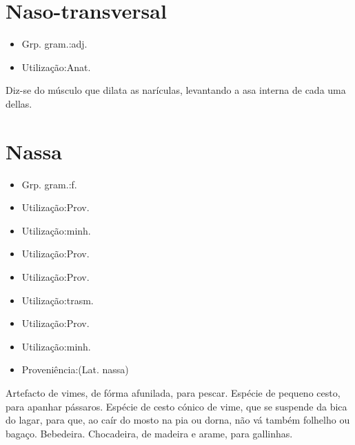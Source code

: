 \section{Naso-transversal}
\begin{itemize}
\item {Grp. gram.:adj.}
\end{itemize}
\begin{itemize}
\item {Utilização:Anat.}
\end{itemize}
Diz-se do músculo que dilata as narículas, levantando a asa interna de cada uma dellas.
\section{Nassa}
\begin{itemize}
\item {Grp. gram.:f.}
\end{itemize}
\begin{itemize}
\item {Utilização:Prov.}
\end{itemize}
\begin{itemize}
\item {Utilização:minh.}
\end{itemize}
\begin{itemize}
\item {Utilização:Prov.}
\end{itemize}
\begin{itemize}
\item {Utilização:Prov.}
\end{itemize}
\begin{itemize}
\item {Utilização:trasm.}
\end{itemize}
\begin{itemize}
\item {Utilização:Prov.}
\end{itemize}
\begin{itemize}
\item {Utilização:minh.}
\end{itemize}
\begin{itemize}
\item {Proveniência:(Lat. \textunderscore nassa\textunderscore )}
\end{itemize}
Artefacto de vimes, de fórma afunilada, para pescar.
Espécie de pequeno cesto, para apanhar pássaros.
Espécie de cesto cónico de vime, que se suspende da bica do lagar, para que, ao caír do mosto na pia ou dorna, não vá também folhelho ou bagaço.
Bebedeira.
Chocadeira, de madeira e arame, para gallinhas.
